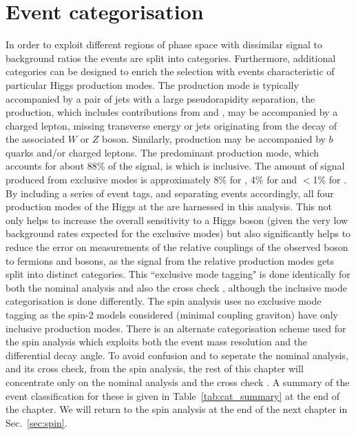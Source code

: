 \section{Event categorisation}
\label{sec:categorisation}

In order to exploit different regions of phase space with dissimilar signal to background ratios the events are split into categories. Furthermore, additional categories can be designed to enrich the selection with events characteristic of particular Higgs production modes. The \VBF production mode is typically accompanied by a pair of jets with a large pseudorapidity separation, the \VH production, which includes contributions from \WH and \ZH, may be accompanied by a charged lepton, missing transverse energy or jets originating from the decay of the associated $W$ or $Z$ boson. Similarly, \ttH production may be accompanied by $b$ quarks and/or charged leptons. The predominant production mode, which accounts for about 88\% of the signal, is \ggH which is inclusive. The amount of signal produced from exclusive modes is approximately 8\% for \VBF, 4\% for \VH and $<$1\% for \ttH. By including a series of event tags, and separating events accordingly, all four production modes of the Higgs at the \LHC are harnessed in this analysis. This not only helps to increase the overall sensitivity to a \SM Higgs boson (given the very low background rates expected for the exclusive modes) but also significantly helps to reduce the error on measurements of the relative couplings of the observed boson to fermions and bosons, as the signal from the relative production modes gets split into distinct categories. This ``exclusive mode tagging" is done identically for both the nominal \MFM analysis and also the cross check \SMVA, although the inclusive mode categorisation is done differently. The \CiC spin analysis uses no exclusive mode tagging as the spin-2 models considered (minimal coupling graviton) have only inclusive production modes. There is an alternate categorisation scheme used for the spin analysis which exploits both the event mass resolution and the differential decay angle. To avoid confusion and to seperate the nominal analysis, and its cross check, from the spin analysis, the rest of this chapter will concentrate only on the nominal \MFM analysis and the cross check \SMVA. A summary of the event classification for these is given in Table~\ref{tab:cat_summary} at the end of the chapter. We will return to the spin analysis at the end of the next chapter in Sec.~\ref{sec:spin}.

